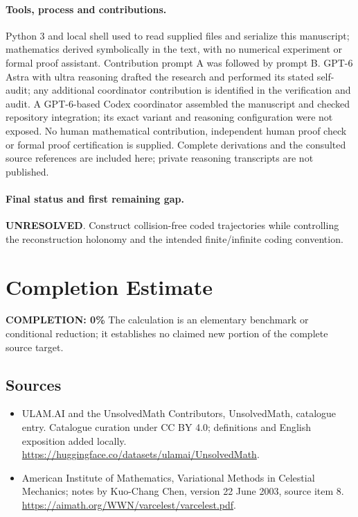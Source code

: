 \documentclass[11pt]{article}
\begin{document}
\paragraph{Tools, process and contributions.}
Python 3 and local shell used to read supplied files and serialize this manuscript; mathematics derived symbolically in the text, with no numerical experiment or formal proof assistant. Contribution prompt A was followed by prompt B. GPT-6 Astra with ultra reasoning drafted the research and performed its stated self-audit; any additional coordinator contribution is identified in the verification and audit. A GPT-6-based Codex coordinator assembled the manuscript and checked repository integration; its exact variant and reasoning configuration were not exposed. No human mathematical contribution, independent human proof check or formal proof certification is supplied. Complete derivations and the consulted source references are included here; private reasoning transcripts are not published.

\paragraph{Final status and first remaining gap.}
\textbf{UNRESOLVED}. Construct collision-free coded trajectories while controlling the reconstruction holonomy and the intended finite/infinite coding convention.

\section{Completion Estimate}
\noindent\textbf{COMPLETION: 0\%}
The calculation is an elementary benchmark or conditional reduction; it establishes no claimed new portion of the complete source target.

\subsection{Sources}
\begin{itemize}
\item[\hypertarget{source:statement:1}{S1}] ULAM.AI and the UnsolvedMath Contributors, UnsolvedMath, catalogue entry. Catalogue curation under CC BY 4.0; definitions and English exposition added locally.
\url{https://huggingface.co/datasets/ulamai/UnsolvedMath}.
\item[\hypertarget{source:statement:2}{S2}] American Institute of Mathematics, Variational Methods in Celestial Mechanics; notes by Kuo-Chang Chen, version 22 June 2003, source item 8.
\url{https://aimath.org/WWN/varcelest/varcelest.pdf}.
\end{itemize}
\label{end:statement}
\end{document}
